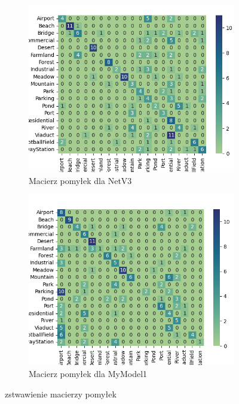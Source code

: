 \documentclass[12pt,twoside]{article}
\begin{document}
\begin{figure}[ht]
	\centering
	\begin{subfigure}[b]{0.4\textwidth}
	  \includegraphics[width=\textwidth]{figures/cmdlav3.png}
	  \caption{Macierz pomyłek dla NetV3}
	  \label{fig:obraz1}
	\end{subfigure}
	\hfill
	\begin{subfigure}[b]{0.4\textwidth}
	  \includegraphics[width=\textwidth]{figures/cdmdlaMymodel.png}
	  \caption{Macierz pomyłek dla MyModel1}
	  \label{fig:obraz2}
	\end{subfigure}
	\caption{zstwawienie macierzy pomyłek}
	
\end{figure}
\end{document}
